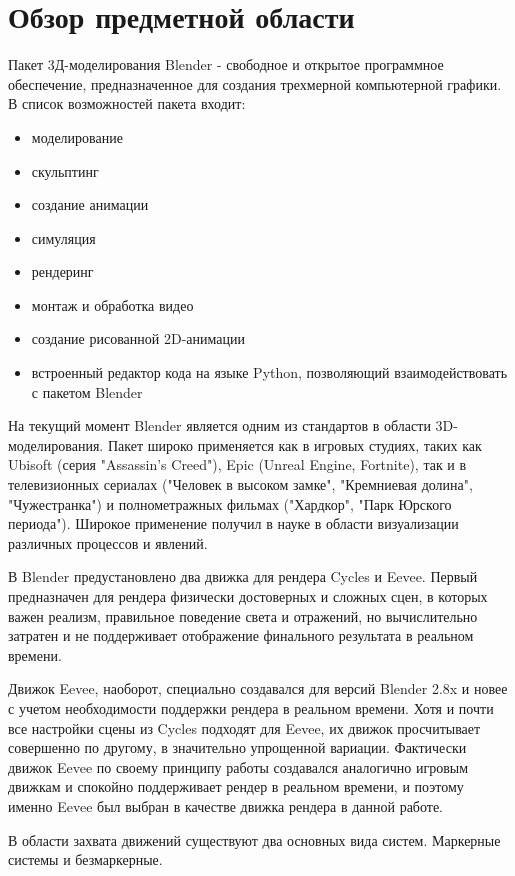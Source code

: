 \section{Обзор предметной области}

Пакет 3Д-моделирования Blender - свободное и открытое программное обеспечение, предназначенное для создания трехмерной компьютерной графики. В список возможностей пакета входит:
\begin{itemize}
	\item моделирование
	\item скульптинг
	\item создание анимации
	\item симуляция
	\item рендеринг
	\item монтаж и обработка видео
	\item создание рисованной 2D-анимации
	\item встроенный редактор кода на языке Python, позволяющий взаимодействовать с пакетом Blender
\end{itemize}

На текущий момент Blender является одним из стандартов в области 3D-моделирования. Пакет широко применяется как в игровых студиях, таких как Ubisoft (серия "Assassin's Creed"), Epic (Unreal Engine, Fortnite), так и в телевизионных сериалах ("Человек в высоком замке", "Кремниевая долина", "Чужестранка") и полнометражных фильмах ("Хардкор", "Парк Юрского периода"). Широкое применение получил в науке в области визуализации различных процессов и явлений.

В Blender предустановлено два движка для рендера Cycles и Eevee. Первый предназначен для рендера физически достоверных и сложных сцен, в которых важен реализм, правильное поведение света и отражений, но вычислительно затратен и не поддерживает отображение финального результата в реальном времени.

Движок Eevee, наоборот, специально создавался для версий Blender 2.8x и новее с учетом необходимости поддержки рендера в реальном времени. Хотя и почти все настройки сцены из Cycles подходят для Eevee, их движок просчитывает совершенно по другому, в значительно упрощенной вариации. Фактически движок Eevee по своему принципу работы создавался аналогично игровым движкам и спокойно поддерживает рендер в реальном времени, и поэтому именно Eevee был выбран в качестве движка рендера в данной работе.

В области захвата движений существуют два основных вида систем. Маркерные системы и безмаркерные.

